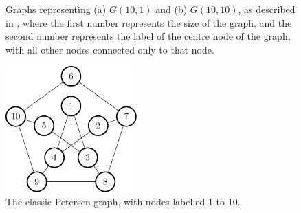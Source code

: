 \begin{figure}
    \centering
    
    \caption[Graphs representing \(G(10,1)\) and \(G(10,10)\)]{\label{fig:gcol:gs}Graphs representing (a) \(G(10,1)\) and (b) \(G(10,10)\), as described in \cite{Gheorghe2013}, where the first number represents the size of the graph, and the second number represents the label of the centre node of the graph, with all other nodes connected only to that node.}
\end{figure}

\begin{figure}
    \centering
    \includegraphics[width=0.45\textwidth]{chapters/gcol/figs/petersen-figure0.pdf}
    \caption[The Petersen Graph]{\label{fig:gcol:petersen}The classic Petersen graph, with nodes labelled 1 to 10.}
\end{figure}

